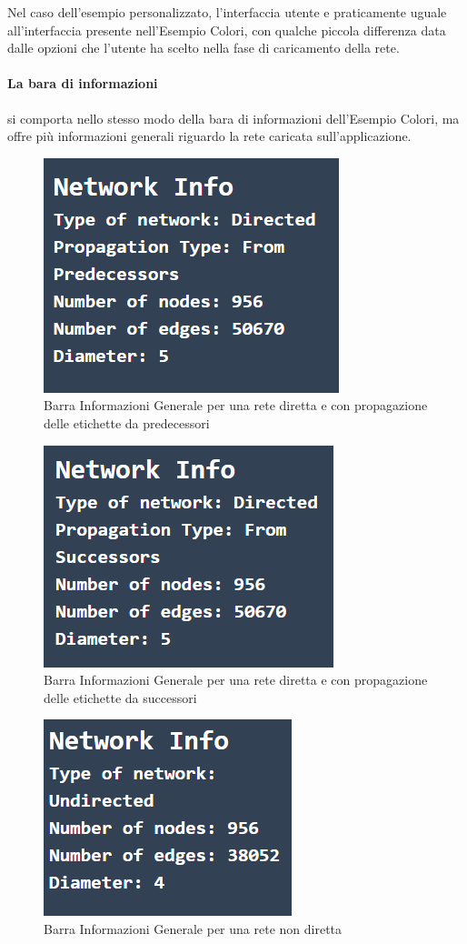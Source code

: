 \documentclass[a4paper,12pt]{report}
\begin{document}
			Nel caso dell'esempio personalizzato, l'interfaccia utente e praticamente uguale all'interfaccia presente nell'Esempio Colori, con qualche piccola differenza data dalle opzioni che l'utente ha scelto nella fase di caricamento della rete.

			\paragraph*{La bara di informazioni} si comporta nello stesso modo della bara di informazioni dell'Esempio Colori, ma offre più informazioni generali riguardo la rete caricata sull'applicazione.
			
			\begin{center}
				\begin{figure}[H]
				\centering
				\includegraphics[width=0.5\linewidth]{infobargeneralcustom}
				\caption{Barra Informazioni Generale per una rete diretta e con propagazione delle etichette da predecessori}
				\end{figure}
				\begin{figure}[H]
				\centering
				\includegraphics[width=0.5\linewidth]{infobargeneralcustomdirectedsuccessors}
				\caption{Barra Informazioni Generale per una rete diretta e con propagazione delle etichette da successori}
				\end{figure}
				\begin{figure}[H]
				\centering
				\includegraphics[width=0.5\linewidth]{infobargeneralcustomundirected}
				\caption{Barra Informazioni Generale per una rete non diretta}
				\end{figure}
			\end{center}
\end{document}
